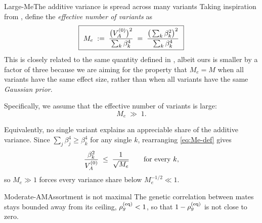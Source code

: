 \documentclass[12pt]{article}
\begin{document}
\begin{assumption}{Large-Me}{The additive variance is spread across many variants}
Taking inspiration from \citet{OConnor2019AJHG}, define the \emph{effective number of variants} as
\begin{equation}\label{eq:Me-def}
    \boxed{\ M_e \;:=\; \frac{\big(V_A^{(0)}\big)^2}{\sum_k \beta_k^4} \;=\; \frac{\big(\sum_k \beta_k^2\big)^2}{\sum_k \beta_k^4} \ }
\end{equation}
This is closely related to the same quantity defined in \citet{OConnor2019AJHG}, albeit ours is smaller by a factor of three because we are aiming for the property that $M_e = M$ when all variants have the same effect size, rather than when all variants have the same \emph{Gaussian prior}.

Specifically, we assume that the effective number of variants is large:
$$M_e \;\gg\; 1 .$$

Equivalently, no single variant explains an appreciable share of the additive variance.
Since $\sum_j \beta_j^4 \geq \beta_k^4$ for any single $k$, rearranging \eqref{eq:Me-def} gives
\begin{equation}\label{eq:Me-bound}
    \frac{\beta_k^2}{V_A^{(0)}} \;\leq\; \frac{1}{\sqrt{M_e}} \qquad \text{for every } k ,
\end{equation}
so $M_e \gg 1$ forces every variance share below $M_e^{-1/2} \ll 1$.
\end{assumption}

\begin{assumption}{Moderate-AM}{Assortment is not maximal}
The genetic correlation between mates stays bounded away from its ceiling, $\rho_g^{(\mathrm{eq})} < 1$, so that $1 - \rho_g^{(\mathrm{eq})}$ is not close to zero.
\end{assumption}
\end{document}
